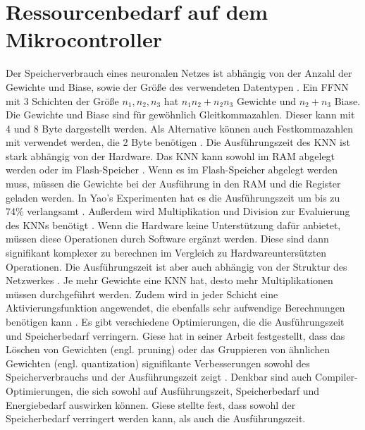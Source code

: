 \section{Ressourcenbedarf auf dem Mikrocontroller}
Der Speicherverbrauch eines neuronalen Netzes ist abhängig von der Anzahl der Gewichte und Biase, sowie der Größe des verwendeten Datentypen \cite{kubikThesis}.
Ein FFNN mit 3 Schichten der Größe $n_1, n_2, n_3$ hat $n_1 n_2 + n_2 n_3$ Gewichte und $n_2 + n_3$ Biase.
Die Gewichte und Biase sind für gewöhnlich Gleitkommazahlen. Dieser kann mit 4 und 8 Byte dargestellt werden.
Als Alternative können auch Festkommazahlen mit verwendet werden, die 2 Byte benötigen \cite{gieseThesis}.
\newline
\newline
Die Ausführungszeit des KNN ist stark abhängig von der Hardware.
Das KNN kann sowohl im RAM abgelegt werden oder im Flash-Speicher \cite{engelhardtThesis}.
Wenn es im Flash-Speicher abgelegt werden muss, müssen die Gewichte bei der Ausführung in den RAM und die Register geladen werden.
In Yao's Experimenten hat es die Ausführungszeit um bis zu 74\% verlangsamt \cite{yaoThesis}.
\newline
\newline
Außerdem wird Multiplikation und Division zur Evaluierung des KNNs benötigt \cite{engelhardtThesis}.
Wenn die Hardware keine Unterstützung dafür anbietet, müssen diese Operationen durch Software ergänzt werden.
Diese sind dann signifikant komplexer zu berechnen im Vergleich zu Hardwareuntersützten Operationen.
\newline
\newline
Die Ausführungszeit ist aber auch abhängig von der Struktur des Netzwerkes \cite{gieseThesis}.
Je mehr Gewichte eine KNN hat, desto mehr Multiplikationen müssen durchgeführt werden.
Zudem wird in jeder Schicht eine Aktivierungsfunktion angewendet, die ebenfalls sehr aufwendige Berechnungen benötigen kann \cite{venzkeArticle}.
\newline
\newline
Es gibt verschiedene Optimierungen, die die Ausführungszeit und Speicherbedarf verringern.
Giese hat in seiner Arbeit festgestellt, dass das Löschen von Gewichten (engl. pruning) oder das Gruppieren von ähnlichen Gewichten (engl. quantization)
signifikante Verbesserungen sowohl des Speicherverbrauchs und der Ausführungszeit zeigt \cite{gieseThesis}.
Denkbar sind auch Compiler-Optimierungen, die sich sowohl auf Ausführungszeit, Speicherbedarf und Energiebedarf auswirken können.
Giese stellte fest, dass sowohl der Speicherbedarf verringert werden kann, als auch die Ausführungszeit.